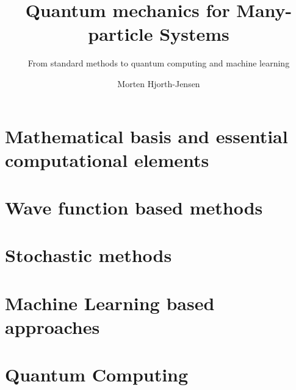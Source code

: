 \documentclass[graybox,envcountchap,sectrefs]{svmono}
\begin{document}
\author{Morten Hjorth-Jensen}
\title{Quantum mechanics for Many-particle Systems}
\subtitle{From standard methods to quantum computing and machine learning}
\maketitle

\frontmatter%

%
%
%
%

\tableofcontents

%


\mainmatter%
 \part{Mathematical basis and essential computational elements}
         
 \clearemptydoublepage
         
 \clearemptydoublepage
         
 \clearemptydoublepage
         
\part{Wave function based methods}
\clearemptydoublepage

\clearemptydoublepage

\clearemptydoublepage

\clearemptydoublepage

\clearemptydoublepage

\clearemptydoublepage

\clearemptydoublepage

\clearemptydoublepage
%
\part{Stochastic methods}

\clearemptydoublepage

\clearemptydoublepage

\clearemptydoublepage

\clearemptydoublepage

\clearemptydoublepage

\part{Machine Learning based approaches}

\clearemptydoublepage

%
%
\part{Quantum Computing}   

 
 

\backmatter%
%
%
\printindex
\end{document}
